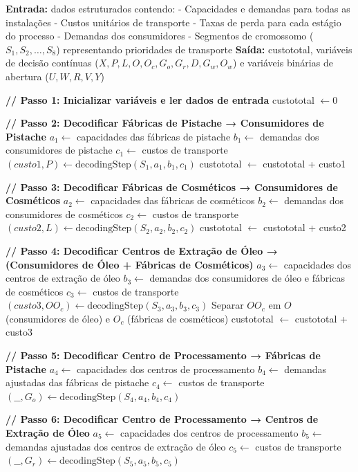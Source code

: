 \documentclass[conference]{IEEEtran}
\begin{document}
\begin{algorithm}
  \caption{Decodificação do cromossomo para a cadeia de suprimentos (Parte 1)}
  \label{algoDecode1}
  \begin{algorithmic}[1]
  \State \textbf{Entrada:} dados estruturados contendo:
  \State - Capacidades e demandas para todas as instalações
  \State - Custos unitários de transporte
  \State - Taxas de perda para cada estágio do processo
  \State - Demandas dos consumidores
  \State - Segmentos de cromossomo ($S_1, S_2, \ldots, S_8$) representando prioridades de transporte
  \State \textbf{Saída:} custototal, variáveis de decisão contínuas ($X, P, L, O, O_c, G_o, G_r, D, G_w, O_w$) e variáveis binárias de abertura ($U, W, R, V, Y$)
  
  \State \textbf{// Passo 1: Inicializar variáveis e ler dados de entrada}
  \State custototal $\leftarrow 0$

  \State \textbf{// Passo 2: Decodificar Fábricas de Pistache → Consumidores de Pistache}
  \State $a_1 \leftarrow$ capacidades das fábricas de pistache
  \State $b_1 \leftarrow$ demandas dos consumidores de pistache
  \State $c_1 \leftarrow$ custos de transporte
  \State $(custo1, P) \leftarrow \text{decodingStep}(S_1, a_1, b_1, c_1)$
  \State custototal $\leftarrow$ custototal + custo1
  
  \State \textbf{// Passo 3: Decodificar Fábricas de Cosméticos → Consumidores de Cosméticos}
  \State $a_2 \leftarrow$ capacidades das fábricas de cosméticos
  \State $b_2 \leftarrow$ demandas dos consumidores de cosméticos
  \State $c_2 \leftarrow$ custos de transporte
  \State $(custo2, L) \leftarrow \text{decodingStep}(S_2, a_2, b_2, c_2)$
  \State custototal $\leftarrow$ custototal + custo2
  
  \State \textbf{// Passo 4: Decodificar Centros de Extração de Óleo → (Consumidores de Óleo + Fábricas de Cosméticos)}
  \State $a_3 \leftarrow$ capacidades dos centros de extração de óleo
  \State $b_3 \leftarrow$ demandas dos consumidores de óleo e fábricas de cosméticos
  \State $c_3 \leftarrow$ custos de transporte
  \State $(custo3, OO_c) \leftarrow \text{decodingStep}(S_3, a_3, b_3, c_3)$
  \State Separar $OO_c$ em $O$ (consumidores de óleo) e $O_c$ (fábricas de cosméticos)
  \State custototal $\leftarrow$ custototal + custo3
  
  \State \textbf{// Passo 5: Decodificar Centro de Processamento → Fábricas de Pistache}
  \State $a_4 \leftarrow$ capacidades dos centros de processamento
  \State $b_4 \leftarrow$ demandas ajustadas das fábricas de pistache
  \State $c_4 \leftarrow$ custos de transporte
  \State $(\_\_, G_o) \leftarrow \text{decodingStep}(S_4, a_4, b_4, c_4)$
  
  \State \textbf{// Passo 6: Decodificar Centro de Processamento → Centros de Extração de Óleo}
  \State $a_5 \leftarrow$ capacidades dos centros de processamento
  \State $b_5 \leftarrow$ demandas ajustadas dos centros de extração de óleo
  \State $c_5 \leftarrow$ custos de transporte
  \State $(\_\_, G_r) \leftarrow \text{decodingStep}(S_5, a_5, b_5, c_5)$
  \EndProcedure
  \end{algorithmic}
\end{algorithm}
\end{document}
